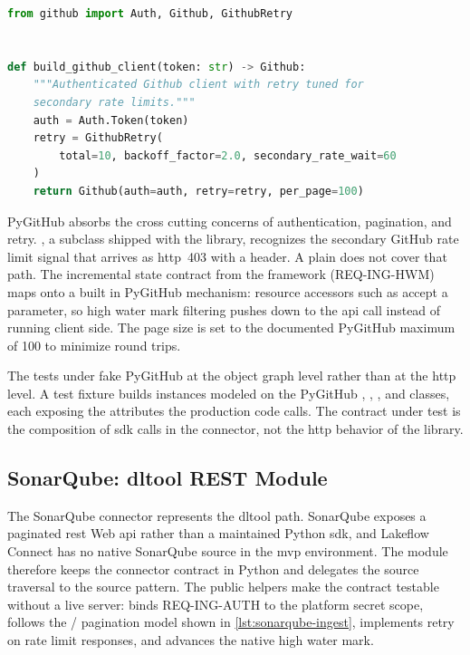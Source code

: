 \begin{lstlisting}[language=Python,caption={[GitHub connector client factory]\texttt{src/connectors/github/ingest.py} (client factory shown)},label={lst:github-ingest}]
from github import Auth, Github, GithubRetry


def build_github_client(token: str) -> Github:
    """Authenticated Github client with retry tuned for
    secondary rate limits."""
    auth = Auth.Token(token)
    retry = GithubRetry(
        total=10, backoff_factor=2.0, secondary_rate_wait=60
    )
    return Github(auth=auth, retry=retry, per_page=100)
\end{lstlisting}

PyGitHub absorbs the cross cutting concerns of authentication, pagination, and retry. , a  subclass shipped with the library, recognizes the secondary GitHub rate limit signal that arrives as \gls{http}~403 with a  header. A plain  does not cover that path. The incremental state contract from the framework (REQ-ING-HWM) maps onto a built in PyGitHub mechanism: resource accessors such as  accept a  parameter, so high water mark filtering pushes down to the \gls{api} call instead of running client side. The page size is set to the documented PyGitHub maximum of 100 to minimize round trips.

The tests under  fake PyGitHub at the object graph level rather than at the \gls{http} level. A test fixture builds  instances modeled on the PyGitHub , , , and  classes, each exposing the attributes the production code calls. The contract under test is the composition of \gls{sdk} calls in the connector, not the \gls{http} behavior of the library.

\subsection{SonarQube: dltool REST Module}
\label{sec:impl-sonarqube-connector}

The SonarQube connector represents the \gls{dltool} path. SonarQube exposes a paginated \gls{rest} Web \gls{api} rather than a maintained Python \gls{sdk}, and Lakeflow Connect has no native SonarQube source in the \gls{mvp} environment. The  module therefore keeps the connector contract in Python and delegates the source traversal to the  source pattern. The public helpers make the contract testable without a live server:  binds REQ-ING-AUTH to the platform secret scope,  follows the / pagination model shown in \autoref{lst:sonarqube-ingest},  implements retry on rate limit responses, and  advances the native  high water mark.

